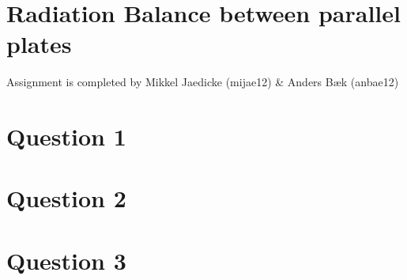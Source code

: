 \section*{Radiation Balance between parallel plates}
Assignment is completed by Mikkel Jaedicke (mijae12) \& Anders Bæk (anbae12)
\section*{Question 1}

\section*{Question 2}
\section*{Question 3}